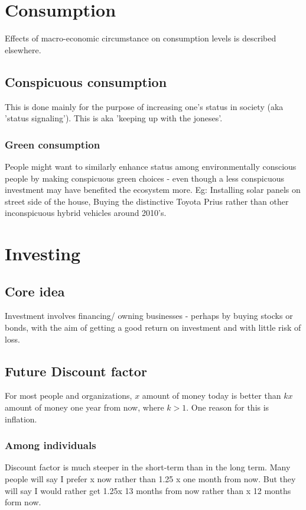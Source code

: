\documentclass[oneside, article]{memoir}
\begin{document}
\tbc

\chapter{Consumption}
Effects of macro-economic circumstance on consumption levels is described elsewhere.

\section{Conspicuous consumption}
This is done mainly for the purpose of increasing one's status in society (aka 'status signaling'). This is aka 'keeping up with the joneses'.

\subsection{Green consumption}
People might want to similarly enhance status among environmentally conscious people by making conspicuous green choices - even though a less conspicuous investment may have benefited the ecosystem more. Eg: Installing solar panels on street side of the house, Buying the distinctive Toyota Prius rather than other inconspicuous hybrid vehicles around 2010's.

\chapter{Investing}
\section{Core idea}
Investment involves financing/ owning businesses - perhaps by buying stocks or bonds, with the aim of getting a good return on investment and with little risk of loss.

\section{Future Discount factor}
For most people and organizations, $x$ amount of money today is better than $kx$ amount of money one year from now, where $k > 1$. One reason for this is inflation.

\subsection{Among individuals}
Discount factor is much steeper in the short-term than in the long term. Many people will say I prefer x now rather than 1.25 x one month from now. But they will say I would rather get 1.25x 13 months from now rather than x 12 months form now.
\end{document}

